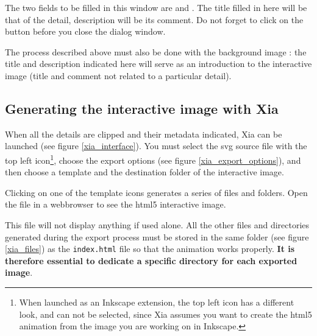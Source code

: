 The two fields to be filled in this window are  and 
.  The title filled in here will be that of the detail, 
description will be its comment. Do not forget to click on the 
button before you close the  dialog window.

The process described above must also be done with the background image : 
the title and description indicated here will serve as an introduction to 
the interactive image (title and comment not related to a particular detail).

\subsection{Generating the interactive image with Xia}

When all the details are clipped and their metadata indicated, Xia can be launched (see figure \ref{xia_interface}).
You must select the svg source file with the top left icon\footnote{When launched as an Inkscape extension, the top
left icon has a different look, and can not be selected, since Xia assumes
you want to create the html5 animation from the image you are working on in Inkscape.},
choose the export options (see figure \ref{xia_export_options}), and then choose a 
template and the destination folder of the interactive image.


Clicking on one of the template icons generates a series of files and folders.
 Open the  file in a 
  webbrowser to see the html5 interactive image.

\begin{alert}
This file will not display anything if used 
alone. All the other files and directories generated during the export process 
must be stored in  the same folder (see figure \ref{xia_files}) 
as the \texttt{index.html} file so that the animation works properly.
\textbf{It is therefore essential to 
dedicate a specific directory for each exported image}.
\end{alert}




